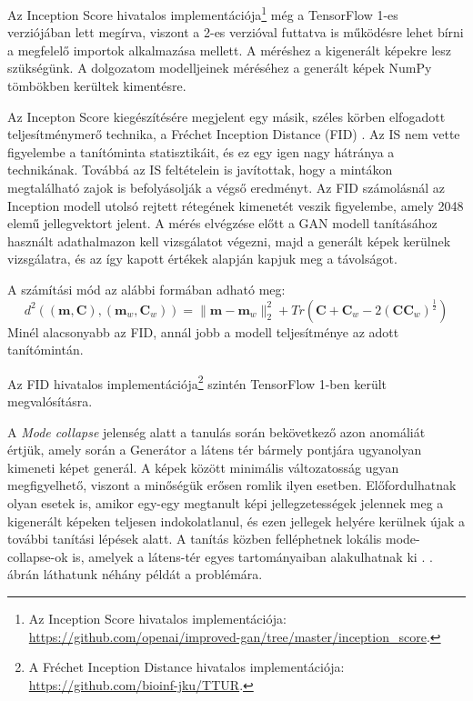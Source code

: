 Az Inception Score hivatalos implementációja\footnote{Az Inception Score hivatalos implementációja: \url{https://github.com/openai/improved-gan/tree/master/inception\_score}.} még a TensorFlow 1-es verziójában lett megírva, viszont a 2-es verzióval futtatva is működésre lehet bírni a megfelelő importok alkalmazása mellett. A méréshez a kigenerált képekre lesz szükségünk. A dolgozatom modelljeinek méréséhez a generált képek NumPy tömbökben kerültek kimentésre.

Az Incepton Score kiegészítésére megjelent egy másik, széles körben elfogadott teljesítménymerő technika, a Fréchet Inception Distance (FID) \cite{heusel2017gans}. Az IS nem vette figyelembe a tanítóminta statisztikáit, és ez egy igen nagy hátránya a technikának. Továbbá az IS feltételein is javítottak, hogy a mintákon megtalálható zajok is befolyásolják a végső eredményt. Az FID számolásnál az Inception modell utolsó rejtett rétegének kimenetét veszik figyelembe, amely 2048 elemű jellegvektort jelent. A mérés elvégzése előtt a GAN modell tanításához használt adathalmazon kell vizsgálatot végezni, majd a generált képek kerülnek vizsgálatra, és az így kapott értékek alapján kapjuk meg a távolságot.

A számítási mód az alábbi formában adható meg:
$$ d^2((\boldsymbol{m}, \boldsymbol{C}), (\boldsymbol{m}_w, \boldsymbol{C}_w)) = \|\boldsymbol{m} - \boldsymbol{m}_w \|_2^2 + Tr(\boldsymbol{C} + \boldsymbol{C}_w - 2(\boldsymbol{C}\boldsymbol{C}_w)^{\frac{1}{2}}) $$
Minél alacsonyabb az FID, annál jobb a modell teljesítménye az adott tanítómintán.

Az FID hivatalos implementációja\footnote{A Fréchet Inception Distance hivatalos implementációja: \url{https://github.com/bioinf-jku/TTUR}.} szintén TensorFlow 1-ben került megvalósításra.


A \textit{Mode collapse} jelenség alatt a tanulás során bekövetkező azon anomáliát értjük, amely során a Generátor a látens tér bármely pontjára ugyanolyan kimeneti képet generál. A képek között minimális változatosság ugyan megfigyelhető, viszont a minőségük erősen romlik ilyen esetben. Előfordulhatnak olyan esetek is, amikor egy-egy megtanult képi jellegzetességek jelennek meg a kigenerált képeken teljesen indokolatlanul, és ezen jellegek helyére kerülnek újak a további tanítási lépések alatt. A tanítás közben felléphetnek lokális mode-collapse-ok is, amelyek a látens-tér egyes tartományaiban alakulhatnak ki \cite{zhang2018stackgan++}. . ábrán láthatunk néhány példát a problémára.


